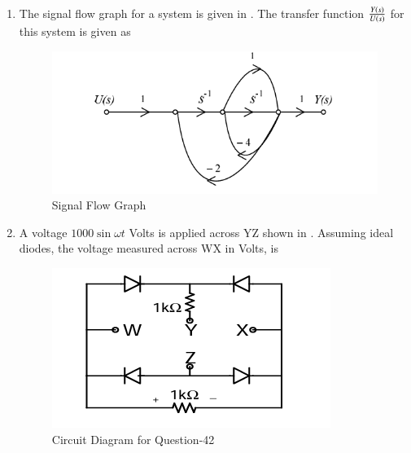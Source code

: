 \documentclass[journal,12pt,onecolumn]{IEEEtran}
\theoremstyle{remark}
\begin{document}
\begin{enumerate}
\item The signal flow graph for a system is given in . The transfer function $\frac{Y\left(s\right)}{U\left(s\right)}$ for this system is given as  
\par \hfill{}
\begin{figure}[H]
\centering
\includegraphics[width=0.5\columnwidth]{Figs/Q-41.png}
\caption{Signal Flow Graph}
\label{41}
\end{figure}
\begin{enumerate}
\end{enumerate}

\item A voltage $1000 \sin \omega t$ Volts is applied across YZ shown in . Assuming ideal diodes, the voltage measured across WX in Volts, is 
\begin{figure}[H]
    \centering
    \includegraphics[width=0.4\linewidth]{Figs/Q-42.png}
    \caption{Circuit Diagram for Question-42}
    \label{42}
\end{figure}
\par \hfill{}
\begin{enumerate}
\end{enumerate}


\end{enumerate}
\end{document}
